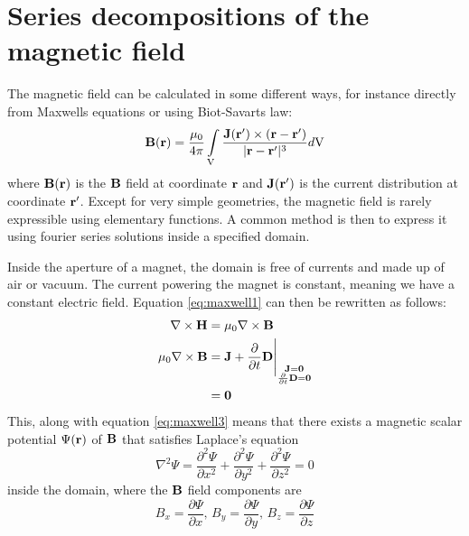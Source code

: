 \section{Series decompositions of the magnetic field} 
\label{sec:series_decompositions}
The magnetic field can be calculated in some different ways, for instance
directly from Maxwells equations or using Biot-Savarts law:
\begin{equation}
    \vb{B}(\vb{r}) = \frac{\mu_0}{4\pi}\int\limits_{\mathrm{V}}
    \frac{\vb{J}(\vb{r'})\times (\vb{r} - \vb{r'})}
    {|\vb{r} - \vb{r'}|^3} d\mathrm{V}
    \label{eq:Biot_Savart}
\end{equation}
where $\vb{B}(\vb{r})$ is the $\vb{B}$ field at coordinate $\vb{r}$ and
$\vb{J}(\vb{r'})$ is the current distribution at coordinate $\vb{r'}$.
\cite[Ch.5.4]{russenschuck_field_2011}
Except for very simple geometries, the magnetic field is rarely
expressible using elementary functions. A common method is then
to express it using fourier series solutions inside a specified domain.
\cite[Ch.6]{russenschuck_field_2011}

Inside the aperture of a magnet, the domain is free of currents and made
up of air or vacuum. The current powering the magnet is constant,
meaning we have a constant electric field. Equation \ref{eq:maxwell1}
can then be rewritten as follows:
\begin{align}
    \begin{split}
        \nabla \times \vb{H} &= \mu_0\nabla \times \vb{B}\\
        \mu_0\nabla \times \vb{B}
        &=\vb{J} + \frac{\partial}{\partial t}\vb{D}
        \Bigg\vert_{\substack{\vb{J}=\vb{0} \\
                \frac{\partial}{\partial t}\vb{D}=\vb{0}}} \\
        &= \vb{0}
    \end{split}
\end{align}
This, along with equation \ref{eq:maxwell3} means that there
exists a magnetic scalar potential $\Psi(\vb{r})$ of $\vb{B}$ that satisfies
Laplace's equation
\begin{equation}
    \nabla^2\Psi = \frac{\partial^2 \Psi}{\partial x^2}
    + \frac{\partial^2 \Psi}{\partial y^2}
    + \frac{\partial^2 \Psi}{\partial z^2} = 0
    \label{eq:laplacian_zero}
\end{equation}
inside the domain, where the $\vb{B}$ field components are
\begin{equation}
    B_x = \frac{\partial \Psi}{\partial x}, \,
    B_y = \frac{\partial \Psi}{\partial y}, \,
    B_z = \frac{\partial \Psi}{\partial z}
\end{equation}

